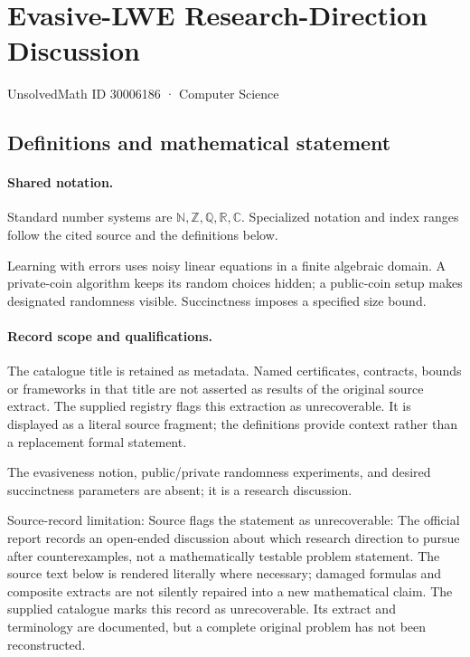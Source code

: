 \documentclass[11pt]{article}
\begin{document}
\setcounter{section}{30006185}
\section{Evasive-LWE Research-Direction Discussion}\label{30006186}
{\small\sffamily UnsolvedMath ID 30006186 · Computer Science}
\subsection{Definitions and mathematical statement}

\paragraph{Shared notation.}Standard number systems are $\mathbb N,\mathbb Z,\mathbb Q,\mathbb R,\mathbb C$. Specialized notation and index ranges follow the cited source and the definitions below.


Learning with errors uses noisy linear equations in a finite algebraic domain. A private-coin algorithm keeps its random choices hidden; a public-coin setup makes designated randomness visible. Succinctness imposes a specified size bound.
\paragraph{Record scope and qualifications.}
The catalogue title is retained as metadata. Named certificates, contracts, bounds or frameworks in that title are not asserted as results of the original source extract.
The supplied registry flags this extraction as unrecoverable. It is displayed as a literal source fragment; the definitions provide context rather than a replacement formal statement.

The evasiveness notion, public/private randomness experiments, and desired succinctness parameters are absent; it is a research discussion.

Source-record limitation: Source flags the statement as unrecoverable: The official report records an open-ended discussion about which research direction to pursue after counterexamples, not a mathematically testable problem statement.
The source text below is rendered literally where necessary; damaged formulas and composite extracts are not silently repaired into a new mathematical claim.
The supplied catalogue marks this record as unrecoverable. Its extract and terminology are documented, but a complete original problem has not been reconstructed.
\end{document}
